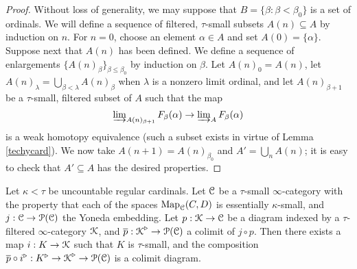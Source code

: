 \begin{proof}
Without loss of generality, we may suppose that $B = \{ \beta: \beta < \beta_0 \}$ is a set of ordinals.
We will define a sequence of filtered, $\tau$-small subsets $A(n) \subseteq A$ by induction on $n$. For $n = 0$, choose an element $\alpha \in A$ and set $A(0) = \{ \alpha\}$. Suppose next that $A(n)$ has been defined. We define a sequence of enlargements $\{ A(n)_{\beta} \}_{\beta \leq \beta_0}$ by induction on $\beta$. Let $A(n)_{0} = A(n)$, let $A(n)_{\lambda} = \bigcup_{\beta < \lambda} A(n)_{\beta}$ when $\lambda$ is a nonzero limit ordinal, and let
$A(n)_{\beta+1}$ be a $\tau$-small, filtered subset of $A$ such that the map
$$ \operatorname{\varinjlim}_{A(n)_{\beta+1} } F_{\beta}(\alpha) \rightarrow \operatorname{\varinjlim}_{A} F_{\beta}(\alpha)$$ is a weak homotopy equivalence (such a subset exists in virtue of Lemma 
\ref{techycard}). We now take $A(n+1) = A(n)_{\beta_0}$ and $A' = \bigcup_{n} A(n)$; it is easy to check that $A' \subseteq A$ has the desired properties.
\end{proof}

\begin{lemma}\label{sorens}
Let $\kappa < \tau$ be uncountable regular cardinals. Let $\operatorname{\mathcal{C}}$ be a $\tau$-small $\infty$-category with the property that each of the spaces $\operatorname{{Map}}_{\operatorname{\mathcal{C}}}(C,D)$ is essentially $\kappa$-small, and $j: \operatorname{\mathcal{C}} \rightarrow \operatorname{\mathcal{P}}(\operatorname{\mathcal{C}})$ the Yoneda embedding. Let
$p: \operatorname{\mathcal{K}} \rightarrow \operatorname{\mathcal{C}}$ be a diagram indexed by a $\tau$-filtered $\infty$-category
$\operatorname{\mathcal{K}}$, and $\overline{p}: \operatorname{\mathcal{K}}^{\triangleright} \rightarrow \operatorname{\mathcal{P}}(\operatorname{\mathcal{C}})$ a colimit of $j \circ p$.
Then there exists a map $i: K \rightarrow \operatorname{\mathcal{K}}$ such that $K$ is $\tau$-small, and the composition
$\overline{p} \circ i^{\triangleright}: K^{\triangleright} \rightarrow \operatorname{\mathcal{K}}^{\triangleright} \rightarrow \operatorname{\mathcal{P}}(\operatorname{\mathcal{C}})$ is a colimit diagram.
\end{lemma}


